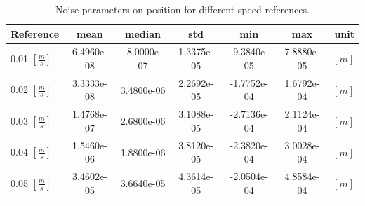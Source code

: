 \documentclass[12pt,a4paper, twoside]{article}
\begin{document}
\begin{table}[H]
	\centering
	\begin{tabular}{l||c|c|c|c|c|r} 
		\textbf{Reference}&\textbf{mean} &\textbf{median} 
		&\textbf{std} & \textbf{min}&\textbf{max}& \textbf{unit}\\ 
		\hline
		\hline 
0.01 $[\frac{m}{s}]$&6.4960e-08&-8.0000e-07&1.3375e-05&-9.3840e-05&7.8880e-05&$[m]$\\\hline
0.02 $[\frac{m}{s}]$&3.3333e-08&3.4800e-06&2.2692e-05&-1.7752e-04&1.6792e-04&$[m]$\\\hline
0.03 $[\frac{m}{s}]$&1.4768e-07&2.6800e-06&3.1088e-05&-2.7136e-04&2.1124e-04&$[m]$\\\hline
0.04 $[\frac{m}{s}]$&1.5460e-06&1.8800e-06&3.8120e-05&-2.3820e-04&3.0028e-04&$[m]$\\\hline
0.05 $[\frac{m}{s}]$&3.4602e-05&3.6640e-05&4.3614e-05&-2.0504e-04&4.8584e-04&$[m]$\\
	\end{tabular} 
	\caption{Noise parameters on position for different speed references.}
	\label{tab:pos_param}
\end{table}
\end{document}
